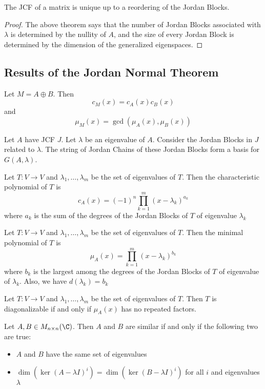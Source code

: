 \begin{crl}{}{} The JCF of a matrix is unique up to a reordering of the Jordan Blocks. \tcbline
\begin{proof}
The above theorem says that the number of Jordan Blocks associated with $\lambda$ is determined by the nullity of $A$, and the size of every Jordan Block is determined by the dimension of the generalized eigenspaces. 
\end{proof}
\end{crl}

\subsection{Results of the Jordan Normal Theorem}
\begin{lmm}{}{} Let $M=A\oplus B$. Then $$c_M(x)=c_A(x)c_B(x)$$ and $$\mu_M(x)=\gcd(\mu_A(x),\mu_B(x))$$
\end{lmm}

\begin{prp}{}{} Let $A$ have JCF $J$.  Let $\lambda$ be an eigenvalue of $A$. Consider the Jordan Blocks in $J$ related to $\lambda$. The string of Jordan Chains of these Jordan Blocks form a basis for $G(A,\lambda)$. 
\end{prp}

\begin{thm}{}{} Let $T:V\to V$ and $\lambda_1,\dots,\lambda_m$ be the set of eigenvalues of $T$. Then the characteristic polynomial of $T$ is $$c_A(x)=(-1)^n\prod_{k=1}^m(x-\lambda_k)^{a_k}$$ where $a_k$ is the sum of the degrees of the Jordan Blocks of $T$ of eigenvalue $\lambda_k$
\end{thm}

\begin{thm}{}{} Let $T:V\to V$ and $\lambda_1,\dots,\lambda_m$ be the set of eigenvalues of $T$. Then the minimal polynomial of $T$ is $$\mu_A(x)=\prod_{k=1}^m(x-\lambda_k)^{b_k}$$ where $b_k$ is the largest among the degrees of the Jordan Blocks of $T$ of eigenvalue of $\lambda_k$. Also, we have $d(\lambda_k)=b_k$
\end{thm}

\begin{thm}{}{} Let $T:V\to V$ and $\lambda_1,\dots,\lambda_m$ be the set of eigenvalues of $T$. Then $T$ is diagonalizable if and only if $\mu_A(x)$ has no repeated factors. 
\end{thm}

\begin{thm}{}{} Let $A,B\in M_{n\times n}(\C)$. Then $A$ and $B$ are similar if and only if the following two are true: 
\begin{itemize}
\item $A$ and $B$ have the same set of eigenvalues
\item $\dim(\ker(A-\lambda I)^i)=\dim(\ker(B-\lambda I)^i)$ for all $i$ and eigenvalues $\lambda$ 
\end{itemize}
\end{thm}

